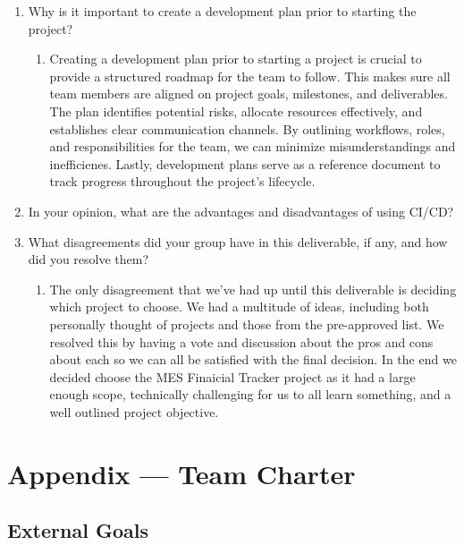 \documentclass{article}
\begin{document}
\begin{enumerate}
    \item Why is it important to create a development plan prior to starting the
    project?
    \begin{enumerate}
      \item Creating a development plan prior to starting a project is crucial to provide a 
      structured roadmap for the team to follow. This makes sure all team members are aligned on 
      project goals, milestones, and deliverables. The plan identifies potential risks, allocate resources
      effectively, and establishes clear communication channels. By outlining workflows, roles, 
      and responsibilities for the team, we can minimize misunderstandings and inefficienes. Lastly, 
      development plans serve as a reference document to track progress throughout the project's lifecycle.
    \end{enumerate}
    \item In your opinion, what are the advantages and disadvantages of using
    CI/CD?
    \item What disagreements did your group have in this deliverable, if any,
    and how did you resolve them?
      \begin{enumerate}
        \item The only disagreement that we've had up until this deliverable is deciding which project to 
        choose. We had a multitude of ideas, including both personally thought of projects and those from the 
        pre-approved list. We resolved this by having a vote and discussion about the pros and cons about each
        so we can all be satisfied with the final decision. In the end we decided choose the MES Finaicial Tracker 
        project as it had a large enough scope, technically challenging for us to all learn something, and a well 
        outlined project objective. 
      \end{enumerate}
\end{enumerate}

\newpage{}

\section*{Appendix --- Team Charter}


\subsection*{External Goals}
\end{document}
